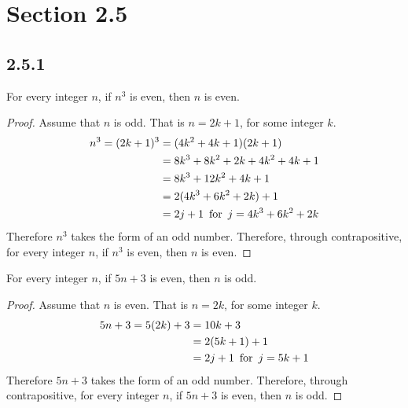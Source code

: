 





\section*{Section 2.5}

\subsection*{2.5.1}
\begin{enumerate}
   For every integer $n$, if $n^3$ is even, then $n$ is even.
  \begin{proof}
    Assume that $n$ is odd. That is $n = 2k+1$, for some integer $k$.
    \begin{align*}
      n^3 = (2k+1)^3 & = (4k^2+4k+1)(2k+1)                \\
                     & = 8k^3 + 8k^2 + 2k + 4k^2 + 4k + 1 \\
                     & = 8k^3 + 12k^2 + 4k + 1            \\
                     & = 2(4k^3+6k^2+2k) + 1              \\
                     & = 2j+1 \operatorname{~\text{for}~} j = 4k^3+6k^2+2k
    \end{align*}
    Therefore $n^3$ takes the form of an odd number.
    Therefore, through contrapositive, for every integer $n$, if $n^3$ is even,
    then $n$ is even.
  \end{proof}
   For every integer $n$, if $5n+3$ is even, then $n$ is odd.
  \begin{proof}
    Assume that $n$ is even. That is $n = 2k$, for some integer $k$.
    \begin{align*}
      5n+3 = 5(2k) + 3 & = 10k + 3             \\
                       & = 2(5k+1) + 1         \\
                       & = 2j+1 \operatorname{~\text{for}~} j = 5k+1
    \end{align*}
    Therefore $5n+3$ takes the form of an odd number.
    Therefore, through contrapositive, for every integer $n$, if $5n+3$ is even,
    then $n$ is odd.
  \end{proof}
\end{enumerate}

